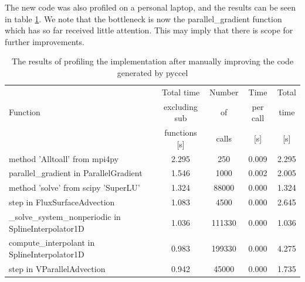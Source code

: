 The new code was also profiled on a personal laptop, and the results can be seen in table \ref{tab::yaman profile}. We note that the bottleneck is now the parallel\_gradient function which has so far received little attention. This may imply that there is scope for further improvements.

\begin{table}[ht]
\centering
 \begin{tabular}{|m{}|c|c|c|c|}
  \hline
          & Total time & Number & Time & Total \\
  Function & excluding sub & of & per call & time \\
          & functions [s] & calls & [s] & [s] \\
  \hline
  \hline
  method 'Alltoall' from mpi4py & 2.295 & 250 & 0.009 & 2.295 \\
  \hline
  parallel\_gradient in ParallelGradient & 1.546 & 1000 & 0.002 & 2.005 \\
  \hline
  method 'solve' from scipy 'SuperLU' & 1.324 & 88000 & 0.000 & 1.324 \\
  \hline
  step in FluxSurfaceAdvection & 1.083 & 4500 & 0.000 & 2.645 \\
  \hline
  \_solve\_system\_nonperiodic in SplineInterpolator1D & 1.036 & 111330 & 0.000 & 1.036 \\
  \hline
  compute\_interpolant in SplineInterpolator1D & 0.983 & 199330 & 0.000 & 4.275\\
  \hline
  step in VParallelAdvection & 0.942 & 45000 & 0.000 & 1.735\\
  \hline
 \end{tabular}
 \caption{\label{tab::yaman profile} The results of profiling the implementation after manually improving the code generated by pyccel}
\end{table}